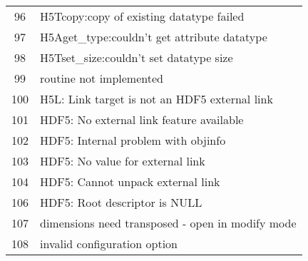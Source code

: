 \begin{longtable}{c >{\raggedright\arraybackslash}p{\Pwidth}}
96  & H5Tcopy:copy of existing datatype failed \\
97  & H5Aget\_type:couldn't get attribute datatype \\
98  & H5Tset\_size:couldn't set datatype size \\
99  & routine not implemented \\
100 & H5L: Link target is not an HDF5 external link \\
101 & HDF5: No external link feature available \\
102 & HDF5: Internal problem with objinfo \\
103 & HDF5: No value for external link \\
104 & HDF5: Cannot unpack external link \\
106 & HDF5: Root descriptor is NULL \\
107 & dimensions need transposed - open in modify mode \\
108 & invalid configuration option
\end{longtable}
